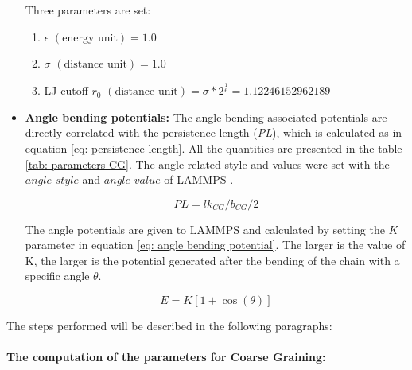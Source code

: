 \begin{itemize}
    Three parameters are set:

    \begin{enumerate} %
        \item $\epsilon$ $(\text{energy unit}) = 1.0$
        \item $\sigma$ $(\text{distance unit}) = 1.0$
        \item LJ cutoff $r_0$ $(\text{distance unit}) = \sigma * 2^{\frac{1}{6}} = 1.12246152962189$
    \end{enumerate}

    \item \textbf{Angle bending potentials: }The angle bending associated potentials are directly correlated with the persistence length (\textit{PL}), which is calculated as in equation \ref{eq: persistence length}. All the quantities are presented in the table \ref{tab: parameters CG}. 
    The angle related style and values were set with the $angle\_style$ and $angle\_value$ of LAMMPS
    \cite{thompsonLAMMPSFlexibleSimulation2022}.


    \begin{equation} \label{eq: persistence length}
        PL = lk_{CG} / b_{CG} / 2
    \end{equation}

    The angle potentials are given to LAMMPS and calculated by setting the $K$ parameter in equation \ref{eq: angle bending potential}. The larger is the value of K, the larger is the potential generated after the bending of the chain with a specific angle $\theta$.

    \begin{equation} \label{eq: angle bending potential}
        E = K[1 + \cos{(\theta)}]    
    \end{equation}

\end{itemize}

The steps performed will be described in the following paragraphs:


\paragraph{The computation of the parameters for Coarse Graining:}

